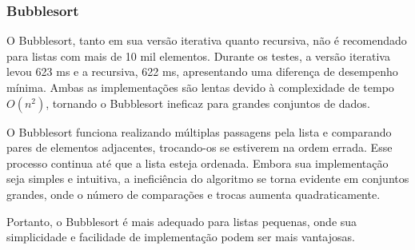 \subsubsection{Bubblesort}

\hspace{0.6cm}O Bubblesort, tanto em sua versão iterativa quanto recursiva, não é recomendado para listas com mais de 10 mil elementos. Durante os testes, a versão iterativa levou 623 ms e a recursiva, 622 ms, apresentando uma diferença de desempenho mínima. Ambas as implementações são lentas devido à complexidade de tempo \(O(n^2)\), tornando o Bubblesort ineficaz para grandes conjuntos de dados.

O Bubblesort funciona realizando múltiplas passagens pela lista e comparando pares de elementos adjacentes, trocando-os se estiverem na ordem errada. Esse processo continua até que a lista esteja ordenada. Embora sua implementação seja simples e intuitiva, a ineficiência do algoritmo se torna evidente em conjuntos grandes, onde o número de comparações e trocas aumenta quadraticamente.

Portanto, o Bubblesort é mais adequado para listas pequenas, onde sua simplicidade e facilidade de implementação podem ser mais vantajosas.

